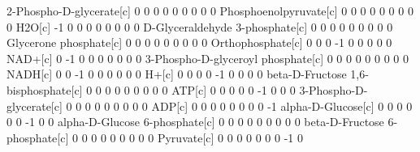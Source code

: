 \begin{Schunk}
\begin{Soutput}
  2-Phospho-D-glycerate[c]              0   0   0   0   0   0   0   0   0
  Phosphoenolpyruvate[c]                0   0   0   0   0   0   0   0   0
  H2O[c]                               -1   0   0   0   0   0   0   0   0
  D-Glyceraldehyde 3-phosphate[c]       0   0   0   0   0   0   0   0   0
  Glycerone phosphate[c]                0   0   0   0   0   0   0   0   0
  Orthophosphate[c]                     0   0   0  -1   0   0   0   0   0
  NAD+[c]                               0  -1   0   0   0   0   0   0   0
  3-Phospho-D-glyceroyl phosphate[c]    0   0   0   0   0   0   0   0   0
  NADH[c]                               0   0  -1   0   0   0   0   0   0
  H+[c]                                 0   0   0   0  -1   0   0   0   0
  beta-D-Fructose 1,6-bisphosphate[c]   0   0   0   0   0   0   0   0   0
  ATP[c]                                0   0   0   0   0  -1   0   0   0
  3-Phospho-D-glycerate[c]              0   0   0   0   0   0   0   0   0
  ADP[c]                                0   0   0   0   0   0   0   0  -1
  alpha-D-Glucose[c]                    0   0   0   0   0   0  -1   0   0
  alpha-D-Glucose 6-phosphate[c]        0   0   0   0   0   0   0   0   0
  beta-D-Fructose 6-phosphate[c]        0   0   0   0   0   0   0   0   0
  Pyruvate[c]                           0   0   0   0   0   0   0  -1   0
\end{Soutput}
\end{Schunk}
